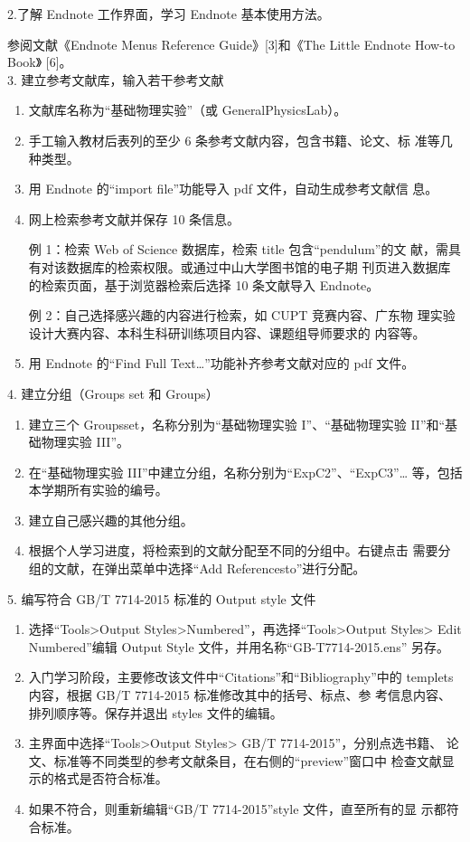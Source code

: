 \documentclass[12pt,a4paper,UTF8]{ctexart}
\begin{document}
2.了解 Endnote 工作界面，学习 Endnote 基本使用方法。

参阅文献《Endnote Menus Reference Guide》[3]和《The Little Endnote How-to Book》
[6]。\\

3. 建立参考文献库，输入若干参考文献

	\begin{enumerate}[(1)]
			\item 文献库名称为“基础物理实验”（或 GeneralPhysicsLab）。
			\item 手工输入教材后表列的至少 6 条参考文献内容，包含书籍、论文、标
			准等几种类型。
			\item 用 Endnote 的“import file”功能导入 pdf 文件，自动生成参考文献信
			息。
			\item 网上检索参考文献并保存 10 条信息。
			
			例 1：检索 Web of Science 数据库，检索 title 包含“pendulum”的文
			献，需具有对该数据库的检索权限。或通过中山大学图书馆的电子期
			刊页进入数据库的检索页面，基于浏览器检索后选择 10 条文献导入
			Endnote。

			例 2：自己选择感兴趣的内容进行检索，如 CUPT 竞赛内容、广东物
			理实验设计大赛内容、本科生科研训练项目内容、课题组导师要求的
			内容等。
			\item 用 Endnote 的“Find Full Text…”功能补齐参考文献对应的 pdf 文件。			
	\end{enumerate}

	4. 建立分组（Groups set 和 Groups）

	\begin{enumerate}[(1)]
		\item 建立三个 Groupsset，名称分别为“基础物理实验 I”、“基础物理实验
		II”和“基础物理实验 III”。
		\item 在“基础物理实验 III”中建立分组，名称分别为“ExpC2”、“ExpC3”…
		等，包括本学期所有实验的编号。
		\item 建立自己感兴趣的其他分组。
		\item 根据个人学习进度，将检索到的文献分配至不同的分组中。右键点击
		需要分组的文献，在弹出菜单中选择“Add Referencesto”进行分配。
	\end{enumerate}

	5. 编写符合 GB/T 7714-2015 标准的 Output style 文件
	
	\begin{enumerate}[(1)]
		\item 选择“Tools>Output Styles>Numbered”，再选择“Tools>Output Styles> Edit
		Numbered”编辑 Output Style 文件，并用名称“GB-T7714-2015.ens”
		另存。
		\item 入门学习阶段，主要修改该文件中“Citations”和“Bibliography”中的
		templets 内容，根据 GB/T 7714-2015 标准修改其中的括号、标点、参
		考信息内容、排列顺序等。保存并退出 styles 文件的编辑。
		\item 主界面中选择“Tools>Output Styles> GB/T 7714-2015”，分别点选书籍、
		论文、标准等不同类型的参考文献条目，在右侧的“preview”窗口中
		检查文献显示的格式是否符合标准。
		\item 如果不符合，则重新编辑“GB/T 7714-2015”style 文件，直至所有的显
		示都符合标准。
	\end{enumerate}
\end{document}
